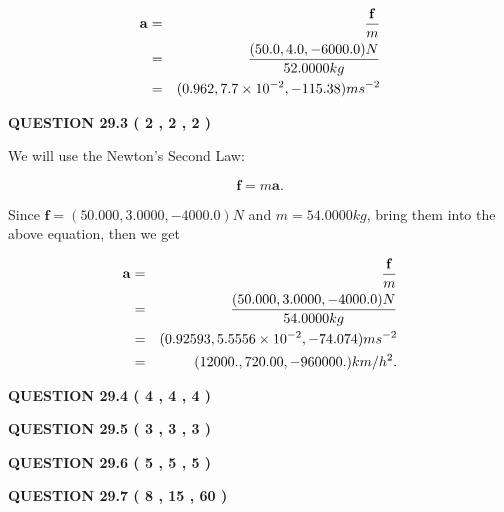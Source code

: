 \documentclass[12pt]{article}
\begin{document}
\begin{eqnarray*}
\mathbf{a}&=&\frac{\mathbf{f}}m  \\
&=&\frac{ %
(50.0 , 4.0 , -6000.0) N}{ %
52.0000kg}  \\
&=& %
(0.962 , 7.7 \times 10^{-2} , -115.38) ms^{-2}
\end{eqnarray*}
 
 
 
  
\vspace{0.2in}
  
{\textbf{\Large{QUESTION
29.3 
 (           2 ,           2 ,           2 )
}}}
  
  
 
 

We will use the Newton's Second Law:
 
\[
\mathbf{f}=m\mathbf{a}.
\]
 
Since $\mathbf{f}=( %
50.000,  %
3.0000,  %
-4000.0 )N$
and $m= %
54.0000kg$, bring them into the above equation, then we get
 
\begin{eqnarray*}
\mathbf{a}&=&\frac{\mathbf{f}}m  \\
&=&\frac{(
50.000 ,
3.0000 ,
-4000.0 )N
}{ %
54.0000 kg}  \\
&=&(
0.92593 ,
5.5556 \times 10^{-2},
-74.074
)ms^{-2} \\
&=&(
12000. ,
720.00 ,
-960000.
)km/h^2.
\end{eqnarray*}
 
 
 
  
\vspace{0.2in}
  
{\textbf{\Large{QUESTION
29.4 
 (           4 ,           4 ,           4 )
}}}
  
  
  
\vspace{0.2in}
  
{\textbf{\Large{QUESTION
29.5 
 (           3 ,           3 ,           3 )
}}}
  
  
  
\vspace{0.2in}
  
{\textbf{\Large{QUESTION
29.6 
 (           5 ,           5 ,           5 )
}}}
  
  
  
\vspace{0.2in}
  
{\textbf{\Large{QUESTION
29.7 
 (           8 ,          15 ,          60 )
}}}
  
\end{document}
